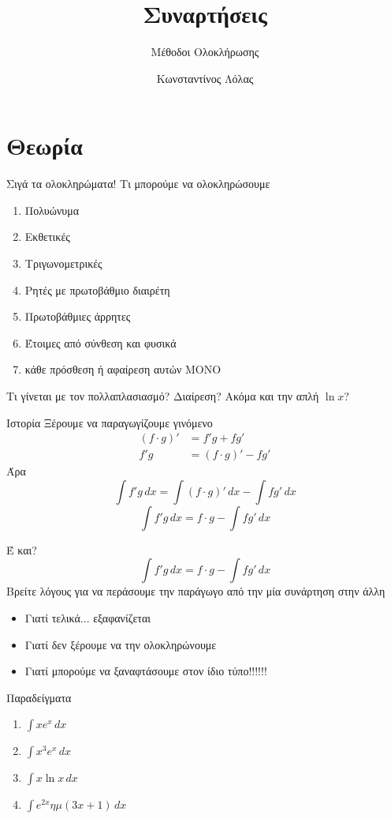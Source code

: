 \documentclass{presentation}
\title{Συναρτήσεις}
\subtitle{Μέθοδοι Ολοκλήρωσης}
\author[Λόλας]{Κωνσταντίνος Λόλας}
\begin{document}
\begin{frame}
  \titlepage
\end{frame}

\section{Θεωρία}
\begin{frame}{Σιγά τα ολοκληρώματα!}
  Τι μπορούμε να ολοκληρώσουμε
  \begin{enumerate}
    \item Πολυώνυμα
    \item Εκθετικές
    \item Τριγωνομετρικές
    \item Ρητές με πρωτοβάθμιο διαιρέτη
    \item Πρωτοβάθμιες άρρητες
    \item Έτοιμες από σύνθεση και φυσικά
    \item κάθε πρόσθεση ή αφαίρεση αυτών ΜΟΝΟ
  \end{enumerate}
  Τι γίνεται με τον πολλαπλασιασμό? Διαίρεση? Ακόμα και την απλή $\ln x$?
\end{frame}

\begin{frame}{Ιστορία}
  Ξέρουμε να παραγωγίζουμε γινόμενο
  \begin{align*}
    (f\cdot g)' & =f'g+fg'         \\
    f'g         & =(f\cdot g)'-fg'
  \end{align*}
   {
      Άρα
      $$\int f'g\, dx=\int (f\cdot g)'\,dx - \int fg'\, dx$$
      $$\int f'g\, dx=f\cdot g - \int fg'\, dx$$}
\end{frame}

\begin{frame}{Έ και?}
  $$\int f'g\, dx=f\cdot g - \int fg'\, dx$$
  Βρείτε λόγους για να περάσουμε την παράγωγο από την μία συνάρτηση στην άλλη
  \begin{itemize}
    \item<2-> Γιατί τελικά... εξαφανίζεται
    \item<3-> Γιατί δεν ξέρουμε να την ολοκληρώνουμε
    \item<4-> Γιατί μπορούμε να ξαναφτάσουμε στον ίδιο τύπο!!!!!!
  \end{itemize}
\end{frame}

\begin{frame}{Παραδείγματα}
  \begin{enumerate}
    \item<1-> $\int xe^x\,dx$
    \item<2-> $\int x^3e^x\,dx$
    \item<3-> $\int x\ln x\,dx$
    \item<4-> $\int e^{2x}ημ(3x+1)\,dx$
  \end{enumerate}
\end{frame}
\end{document}

